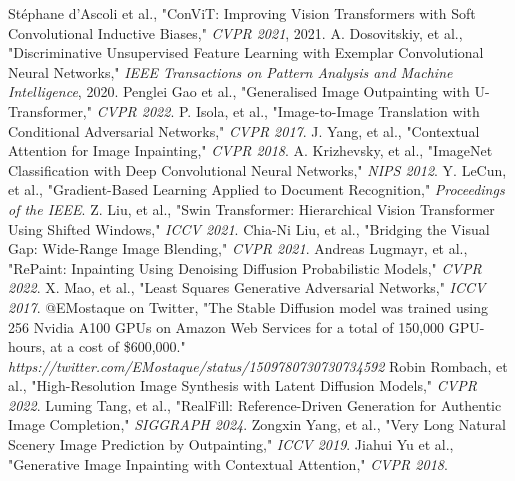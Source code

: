 \documentclass[sigconf]{acmart}
\begin{document}
\begin{thebibliography}{9}
     Stéphane d’Ascoli et al., "ConViT: Improving Vision Transformers with Soft Convolutional Inductive Biases," \textit{CVPR 2021}, 2021.
     A. Dosovitskiy, et al., "Discriminative Unsupervised Feature Learning with Exemplar Convolutional Neural Networks," \textit{IEEE Transactions on Pattern Analysis and Machine Intelligence}, 2020.
     Penglei Gao et al., "Generalised Image Outpainting with U-Transformer," \textit{CVPR 2022}.
     P. Isola, et al., "Image-to-Image Translation with Conditional Adversarial Networks," \textit{CVPR 2017}.
     J. Yang, et al., "Contextual Attention for Image Inpainting," \textit{CVPR 2018}.
     A. Krizhevsky, et al., "ImageNet Classification with Deep Convolutional Neural Networks," \textit{NIPS 2012}.
     Y. LeCun, et al., "Gradient-Based Learning Applied to Document Recognition," \textit{Proceedings of the IEEE}.
     Z. Liu, et al., "Swin Transformer: Hierarchical Vision Transformer Using Shifted Windows," \textit{ICCV 2021}.
     Chia-Ni Liu, et al., "Bridging the Visual Gap: Wide-Range Image Blending," \textit{CVPR 2021}.
     Andreas Lugmayr, et al., "RePaint: Inpainting Using Denoising Diffusion Probabilistic Models," \textit{CVPR 2022}.
     X. Mao, et al., "Least Squares Generative Adversarial Networks," \textit{ICCV 2017}.
     @EMostaque on Twitter, "The Stable Diffusion model was trained using 256 Nvidia A100 GPUs on Amazon Web Services for a total of 150,000 GPU-hours, at a cost of \$600,000." \textit{https://twitter.com/EMostaque/status/1509780730730734592}
     Robin Rombach, et al., "High-Resolution Image Synthesis with Latent Diffusion Models," \textit{CVPR 2022}.
     Luming Tang, et al., "RealFill: Reference-Driven Generation for Authentic Image Completion," \textit{SIGGRAPH 2024}.
     Zongxin Yang, et al., "Very Long Natural Scenery Image Prediction by Outpainting," \textit{ICCV 2019}.
     Jiahui Yu et al., "Generative Image Inpainting with Contextual Attention," \textit{CVPR 2018}.
\end{thebibliography}
\end{document}

